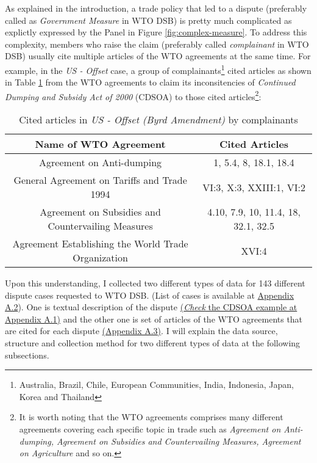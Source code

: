 As explained in the introduction,
a trade policy that led to a dispute (preferably called as \textit{Government Measure} in WTO DSB) is pretty much complicated as explictly expressed by the Panel in Figure \ref{fig:complex-measure}.
To address this complexity,
members who raise the claim (preferably called \textit{complainant} in WTO DSB) usually cite multiple articles of the WTO agreements at the same time. For example, in the
\textit{US - Offset} case,
a group of complainants\footnote{Australia,
    Brazil,
    Chile,
    European Communities,
    India,
    Indonesia,
    Japan,
    Korea and Thailand}
cited articles as shown in Table \ref{xltabular:cited-article-for-us-offset} from the WTO agreements to claim its inconsitencies of \textit{Continued Dumping and Subsidy Act of 2000} (CDSOA) to those cited articles\footnote{It is worth noting that the WTO agreements comprises many different agreements covering each specific topic in trade such as \textit{Agreement on Anti-dumping, Agreement on Subsidies and Countervailing Measures, Agreement on Agriculture} and so on.}:
\\
\begin{table}[h]
    \setlength\tabcolsep{15pt}
    \begin{tabular}{ c | c }
        \hline
        \textbf{\normalsize Name of WTO Agreement}          & \textbf{\normalsize Cited Articles} \\
        \hline \hline
        Agreement on Anti-dumping                           & 1, 5.4, 8, 18.1, 18.4               \\ \hline
        General Agreement on Tariffs and Trade 1994         & VI:3, X:3, XXIII:1, VI:2            \\ \hline
        Agreement on Subsidies and Countervailing Measures  & 4.10, 7.9, 10, 11.4, 18, 32.1, 32.5 \\ \hline
        Agreement Establishing the World Trade Organization & XVI:4                               \\ \hline
    \end{tabular}
    \caption{Cited articles in \textit{US - Offset (Byrd Amendment)} by complainants}
    \label{xltabular:cited-article-for-us-offset}
\end{table}

\noindent Upon this understanding,
I collected two different types of data for 143 different dispute cases requested to WTO DSB. (List of cases is
available at \hyperref[sub:cited-articles-table]{Appendix A.2}).
One is textual description of the dispute \hyperref[sub:factual-aspect-example]{(\textit{Check} the CDSOA example at Appendix A.1)} and the other one is
set of articles of the WTO agreements that are
cited for each dispute \hyperref[sub:cited-articles-table]{(Appendix A.3)}.
I will explain the data source, structure and collection method for two different types of data at the following subsections.\\



